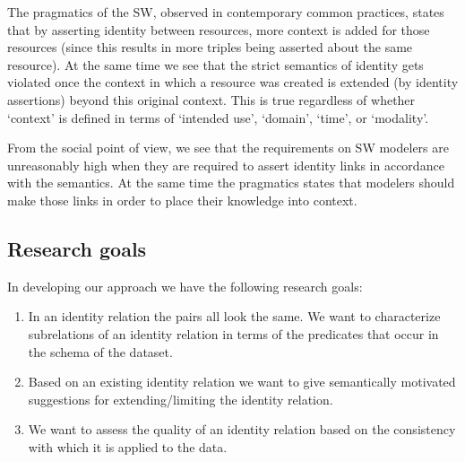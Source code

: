 The pragmatics of the SW, observed in contemporary common practices,
  states that by asserting identity between resources,
  more context is added for those resources
  (since this results in more triples being asserted about the same resource).
At the same time we see that the strict semantics of identity
  gets violated once the context in which a resource was created
  is extended (by identity assertions) beyond this original context.
This is true regardless of whether `context' is defined in terms of
  `intended use', `domain', `time', or `modality'.

From the social point of view,
  we see that the requirements on SW modelers
  are unreasonably high when they are required to
  assert identity links in accordance with the semantics.
At the same time the pragmatics states that modelers should
  make those links in order to place their knowledge into context.

\subsection{Research goals}
\label{sec:research_goals}

In developing our approach we have the following research goals:
\begin{enumerate}
\item In an identity relation the pairs all look the same.
      We want to characterize subrelations of an identity relation in terms
      of the predicates that occur in the schema of the dataset.
\item Based on an existing identity relation we want to give semantically
      motivated suggestions for extending/limiting the identity relation.
\item We want to assess the quality of an identity relation based on
      the consistency with which it is applied to the data.
\end{enumerate}

